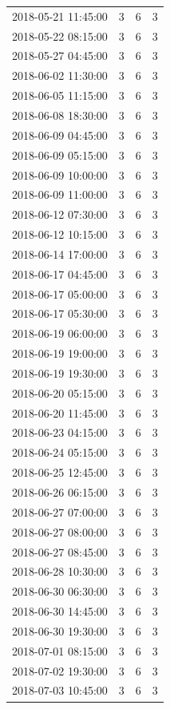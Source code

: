 \begin{tabular}{lrrr}
2018-05-21 11:45:00 & 3 & 6 & 3 \\
2018-05-22 08:15:00 & 3 & 6 & 3 \\
2018-05-27 04:45:00 & 3 & 6 & 3 \\
2018-06-02 11:30:00 & 3 & 6 & 3 \\
2018-06-05 11:15:00 & 3 & 6 & 3 \\
2018-06-08 18:30:00 & 3 & 6 & 3 \\
2018-06-09 04:45:00 & 3 & 6 & 3 \\
2018-06-09 05:15:00 & 3 & 6 & 3 \\
2018-06-09 10:00:00 & 3 & 6 & 3 \\
2018-06-09 11:00:00 & 3 & 6 & 3 \\
2018-06-12 07:30:00 & 3 & 6 & 3 \\
2018-06-12 10:15:00 & 3 & 6 & 3 \\
2018-06-14 17:00:00 & 3 & 6 & 3 \\
2018-06-17 04:45:00 & 3 & 6 & 3 \\
2018-06-17 05:00:00 & 3 & 6 & 3 \\
2018-06-17 05:30:00 & 3 & 6 & 3 \\
2018-06-19 06:00:00 & 3 & 6 & 3 \\
2018-06-19 19:00:00 & 3 & 6 & 3 \\
2018-06-19 19:30:00 & 3 & 6 & 3 \\
2018-06-20 05:15:00 & 3 & 6 & 3 \\
2018-06-20 11:45:00 & 3 & 6 & 3 \\
2018-06-23 04:15:00 & 3 & 6 & 3 \\
2018-06-24 05:15:00 & 3 & 6 & 3 \\
2018-06-25 12:45:00 & 3 & 6 & 3 \\
2018-06-26 06:15:00 & 3 & 6 & 3 \\
2018-06-27 07:00:00 & 3 & 6 & 3 \\
2018-06-27 08:00:00 & 3 & 6 & 3 \\
2018-06-27 08:45:00 & 3 & 6 & 3 \\
2018-06-28 10:30:00 & 3 & 6 & 3 \\
2018-06-30 06:30:00 & 3 & 6 & 3 \\
2018-06-30 14:45:00 & 3 & 6 & 3 \\
2018-06-30 19:30:00 & 3 & 6 & 3 \\
2018-07-01 08:15:00 & 3 & 6 & 3 \\
2018-07-02 19:30:00 & 3 & 6 & 3 \\
2018-07-03 10:45:00 & 3 & 6 & 3 \\

\end{tabular}
